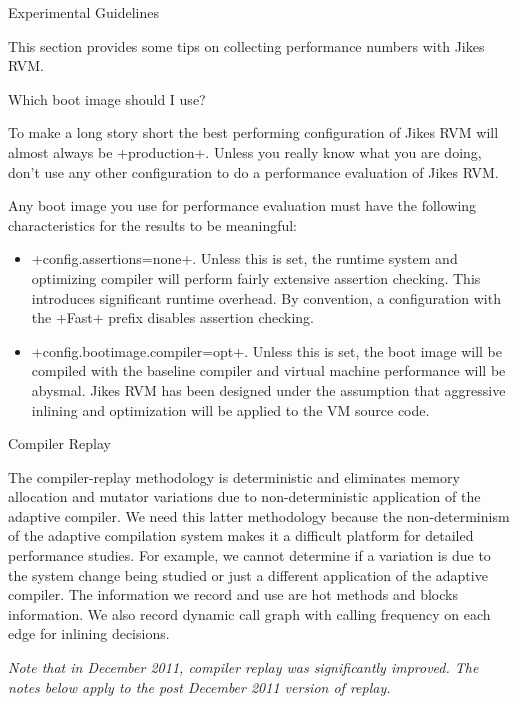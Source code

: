 \begin{chapter}{Experimental Guidelines}
\label{cha:experimentalguidelines}

This section provides some tips on collecting performance numbers with Jikes RVM. 

\begin{section}{Which boot image should I use?}

To make a long story short the best performing configuration of Jikes RVM will almost always be \spverb+production+. Unless you really know what you are doing, don't use any other configuration to do a performance evaluation of Jikes RVM.

Any boot image you use for performance evaluation must have the following characteristics for the results to be meaningful:
\begin{itemize}
    \item \spverb+config.assertions=none+. Unless this is set, the runtime system and optimizing compiler will perform fairly extensive assertion checking. This introduces significant runtime overhead. By convention, a configuration with the \spverb+Fast+ prefix disables assertion checking.
    \item \spverb+config.bootimage.compiler=opt+. Unless this is set, the boot image will be compiled with the baseline compiler and virtual machine performance will be abysmal. Jikes RVM has been designed under the assumption that aggressive inlining and optimization will be applied to the VM source code.
\end{itemize}

\end{section}

\begin{section}{Compiler Replay}

The compiler-replay methodology is deterministic and eliminates memory allocation and mutator variations due to non-deterministic application of the adaptive compiler. We need this latter methodology because the non-determinism of the adaptive compilation system makes it a difficult platform for detailed performance studies. For example, we cannot determine if a variation is due to the system change being studied or just a different application of the adaptive compiler. The information we record and use are hot methods and blocks information. We also record dynamic call graph with calling frequency on each edge for inlining decisions.

\textit{Note that in December 2011, compiler replay was significantly improved.   The notes below apply to the post December 2011 version of replay.}


\end{section}
\end{chapter}
